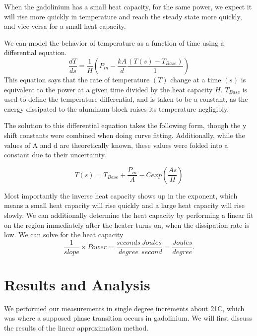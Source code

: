 \documentclass[%
reprint,
amsmath,amssymb,
aps,
]{revtex4-2}
\begin{document}
	When the gadolinium has a small heat capacity, for the same power, we expect it will rise more quickly in temperature and reach the steady state more quickly, and vice versa for a small heat capacity. 
	
	We can model the behavior of temperature as a function of time using a differential equation.
	\begin{equation}
		\frac{dT}{ds}=\frac{1}{H}\left(P_{in}-\frac{kA}{d}\frac{(T(s)-T_{Base})}{1}\right)
	\end{equation}
	This equation says that the rate of temperature $(T)$ change at a time $(s)$ is equivalent to the power at a given time divided by the heat capacity $H$. $T_{Base}$ is used to define the temperature differential, and is taken to be a constant, as the energy dissipated to the aluminum block raises its temperature negligibly.
	
	The solution to this differential equation takes the following form, though the y shift constants were combined when doing curve fitting. Additionally, while the values of A and d are theoretically known, these values were folded into a constant due to their uncertainty.
	
	\begin{equation}
		T(s) = T_{Base} + \frac{P_{in}}{A} - Cexp\left(\frac{As}{H}\right)
	\end{equation}
	
	Most importantly the inverse heat capacity shows up in the exponent, which means a small heat capacity will rise quickly and a large heat capacity will rise slowly. We can additionally determine the heat capacity by performing a linear fit on the region immediately after the heater turns on, when the dissipation rate is low. We can solve for the heat capacity 
	\begin{equation}
		\frac{1}{slope}\times Power = \frac{seconds}{degree}\frac{Joules}{second} = \frac{Joules}{degree}.
	\end{equation}
	
	
	\section{\label{sec:level1}Results and Analysis}
	We performed our measurements in single degree increments about 21\textdegree C, which was where a supposed phase transition occurs in gadolinium\cite{Bednarz}. We will first discuss the results of the linear approximation method.
\end{document}
